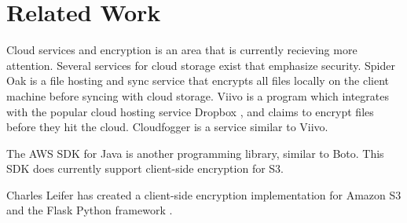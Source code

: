 
\section{Related Work}
Cloud services and encryption is an area that is currently recieving more attention. Several services for cloud storage exist that emphasize security. Spider Oak \cite{spideroak} is a file hosting and sync service that encrypts all files locally on the client machine before syncing with cloud storage. Viivo \cite{viivo} is a program which integrates with the popular cloud hosting service Dropbox \cite{dropbox}, and claims to encrypt files before they hit the cloud. Cloudfogger \cite{cloudfogger} is a service similar to Viivo.

The AWS SDK for Java \cite{aws-sdk-java} is another programming library, similar to Boto. This SDK does currently support client-side encryption for S3.

Charles Leifer has created a client-side encryption implementation for Amazon S3 and the Flask Python framework \cite{flask}.
